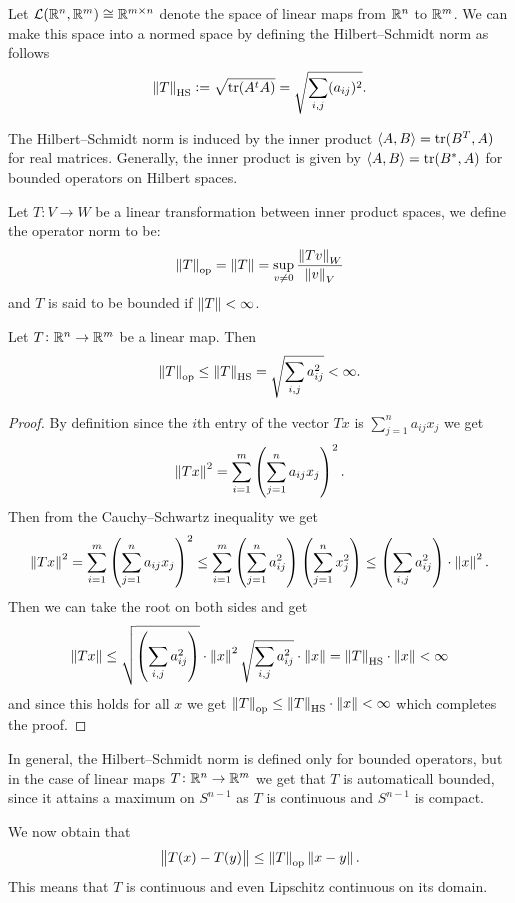\documentclass[11pt,a4paper]{article}
\DeclareMathOperator{\HS}{HS} %
\begin{document}
\begin{definition}
  Let $\mathcal{L}(\mathbb{R}^n,\mathbb{R}^m) \cong \mathbb{R}^{m \times n}$ denote the space of
  linear maps from $\mathbb{R}^n$ to $\mathbb{R}^m$.
  We can make this space into a normed space by defining the
  Hilbert--Schmidt norm as follows
  \[
    \norm{T}_{\HS} := \sqrt{\tr(A^t A)} =
    \sqrt{\sum_{i,j}(a_{ij})^2}.
  \]
\end{definition}
\begin{remark}
  The Hilbert--Schmidt norm is induced by the inner
  product $\left\langle A, B \right\rangle = \operatorname{tr}(B^T,A)$ for real matrices.
  Generally, the inner product is given by $\left\langle A, B \right\rangle = \operatorname{tr}(B^*,A)$
  for bounded operators on Hilbert spaces.
\end{remark}

\begin{definition}
  Let $T \colon V \to W$ be a linear transformation between inner product
  spaces, we define the operator norm to be:
  \[
    \left\lVert T\right\rVert_{\operatorname{op}} = \left\lVert T\right\rVert = 
    \sup_{v \neq 0} \frac{\left\lVert Tv\right\rVert_W}{\left\lVert v\right\rVert_V}
  \]
  and $T$ is said to be bounded if $\left\lVert T\right\rVert < \infty$.
\end{definition}

\begin{proposition}
  Let $T \colon \mathbb{R}^n \to \mathbb{R}^m$ be a linear map.
  Then
  \[
    \norm{T}_{\op} \le 
    \norm{T}_{\HS} = \sqrt{\sum_{i,j} a_{ij}^2} < \infty.
  \]
\end{proposition}
\begin{proof}
  By definition since the $i$th entry of the vector $Tx$ is
  $\sum_{j=1}^{n} a_{ij} x_j$ we get
  \[
    \norm{Tx}^2 =
    \sum_{i=1}^{m} \del{\sum_{j=1}^{n} a_{ij} x_j}^2.
  \]
  Then from the Cauchy--Schwartz inequality we get
  \[
    \norm{Tx}^2 =
    \sum_{i=1}^{m} \del{\sum_{j=1}^{n} a_{ij} x_j}^2 \le
    \sum_{i=1}^{m}
    \del{\sum_{j=1}^{n} a^2_{ij}}
    \del{\sum_{j=1}^{n} x^2_{j}} \le
    \del{\sum_{i,j} a_{ij}^2} \cdot \norm{x}^2.
  \]
  Then we can take the root on both sides and get
  \[
    \norm{Tx} \le
    \sqrt{\del{\sum_{i,j} a_{ij}^2}} \cdot \norm{x}^2
    \sqrt{\sum_{i,j} a_{ij}^2} \cdot \norm{x} =
    \norm{T}_{\HS} \cdot \norm{x} < \infty
  \]
  and since this holds for all $x$ we get
  $\norm{T}_{\op} \le \norm{T}_{\HS} \cdot \norm{x} < \infty$
  which completes the proof.
\end{proof}
\begin{remark}
  In general, the Hilbert--Schmidt norm is defined only for bounded
  operators, but in the case of linear maps $T \colon \mathbb{R}^n \to \mathbb{R}^m$
  we get that $T$ is automaticall bounded, since it attains
  a maximum on $S^{n-1}$ as $T$ is continuous and $S^{n-1}$ is compact. 
\end{remark}
\begin{corollary}
  We now obtain that
  \[
    \left\lVert T(x) - T(y)\right\rVert \le \left\lVert T\right\rVert_{\operatorname{op}} \left\lVert x - y\right\rVert.
  \]
  This means that $T$ is continuous
  and even Lipschitz continuous on its domain.
\end{corollary}
\end{document}
